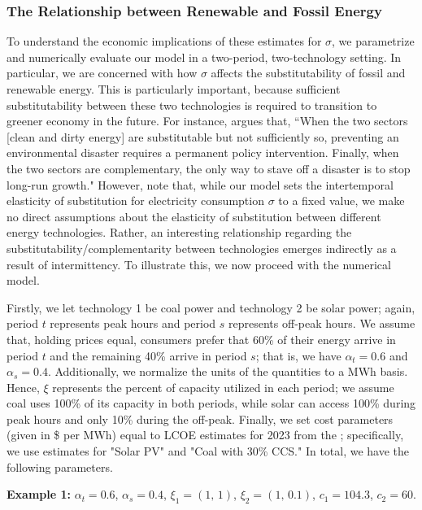 \documentclass[11pt,a4paper]{extarticle}
\begin{document}
\subsubsection{The Relationship between Renewable and Fossil Energy}


To understand the economic implications of these estimates for $\sigma$, we parametrize and numerically evaluate our model in a two-period, two-technology setting. In particular, we are concerned with how $\sigma$ affects the substitutability of fossil and renewable energy. This is particularly important, because sufficient substitutability between these two technologies is required to transition to greener economy in the future. For instance, \citet{Ace2012} argues that, ``When the two
sectors [clean and dirty energy] are substitutable but not sufficiently so, preventing an environmental disaster requires a permanent policy intervention. Finally, when the two sectors are complementary, the only way to stave off a disaster is to stop long-run growth." However, note that, while our model sets the intertemporal elasticity of substitution for  electricity consumption $\sigma$ to a fixed value, we make no direct assumptions about the elasticity of substitution between different energy technologies. Rather, an interesting relationship regarding the substitutability/complementarity between technologies emerges indirectly as a result of intermittency. To illustrate this, we now proceed with the numerical model.

Firstly, we let technology 1 be coal power and technology 2 be solar power; again, period $t$ represents peak hours and period $s$ represents off-peak hours. We assume that, holding prices equal, consumers prefer that 60\% of their energy arrive in period $t$ and the remaining 40\% arrive in period $s$; that is, we have $\alpha_t = 0.6$ and $\alpha_s = 0.4$. Additionally, we normalize the units of the quantities to a MWh basis. Hence, $\xi$ represents the percent of capacity utilized in each period; we assume coal uses 100\% of its capacity in both periods, while solar can access 100\% during peak hours and only 10\% during the off-peak. Finally, we set cost parameters (given in  \$ per MWh)  equal to LCOE estimates for 2023 from the \citet{EIALCOE}; specifically, we use estimates for "Solar PV" and "Coal with 30\% CCS." In total, we have the following parameters. 

\begin{center}
	\noindent \textbf{Example  1:} $\alpha_t = 0.6$, $\alpha_s = 0.4$, $\xi_1 = (1, \, 1)$, $\xi_2 = (1, \, 0.1)$, $c_1 = 104.3$, $c_2 = 60$. 
\end{center}
\end{document}
